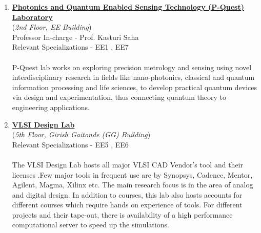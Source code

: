 \documentclass[openany]{book} %
\begin{document}
\begin{enumerate}
\item \href{http://www.ee.iitb.ac.in/~kasturis/index.php} {\color{blue} \textbf{Photonics and Quantum Enabled Sensing Technology (P-Quest) Laboratory}}\\
    (\textit{2nd Floor, EE Building})\\
    Professor In-charge - Prof. Kasturi Saha\\
Relevant Specializations - EE1 , EE7\\
\\
P-Quest lab works on exploring precision metrology and sensing using novel interdisciplinary research in fields like nano-photonics, classical and quantum information processing and life sciences, to develop practical quantum devices via design and experimentation, thus connecting quantum theory to engineering applications.\\

\item \href{https://www.ee.iitb.ac.in/vlsi/} {\color{blue} \textbf{VLSI Design Lab}}\\
    (\textit{5th Floor, Girish Gaitonde (GG) Building})\\
Relevant Specializations - EE5 , EE6\\
\\
The VLSI Design Lab hosts all major VLSI CAD Vendor’s tool and their licenses .Few major tools in frequent use are by Synopsys, Cadence, Mentor, Agilent, Magma, Xilinx etc. The main research focus is in the area of analog and digital design. In addition to courses, this lab also hosts accounts for different courses which require hands on experience of tools. For different projects and their tape-out, there is availability of a high performance computational server to speed up the simulations.\\


\end{enumerate}
\end{document}
